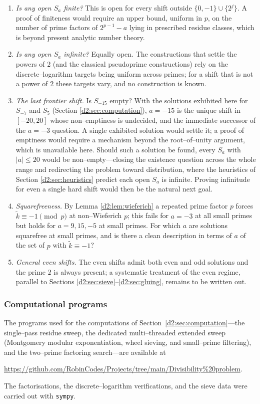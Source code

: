 \documentclass[a4paper]{article}
\theoremstyle{plain}
\theoremstyle{definition}
\theoremstyle{remark}
\newcommand{\Sa}{S_a}
\begin{document}
\begin{enumerate}
\item \emph{Is any open $\Sa$ finite?} This is open for every shift outside $\{0,-1\}\cup\{2^{j}\}$. A proof of finiteness would require an upper bound, uniform in $p$, on the number of prime factors of $2^{p-1}-a$ lying in prescribed residue classes, which is beyond present analytic number theory.
\item \emph{Is any open $\Sa$ infinite?} Equally open. The constructions that settle the powers of $2$ (and the classical pseudoprime constructions) rely on the discrete--logarithm targets being uniform across primes; for a shift that is not a power of $2$ these targets vary, and no construction is known.
\item \emph{The last frontier shift.} Is $S_{-15}$ empty? With the solutions exhibited here for $S_{-7}$ and $S_5$ (Section \ref{d2:sec:computation}), $a=-15$ is the unique shift in $[-20,20]$ whose non--emptiness is undecided, and the immediate successor of the $a=-3$ question. A single exhibited solution would settle it; a proof of emptiness would require a mechanism beyond the root--of--unity argument, which is unavailable here. Should such a solution be found, every $S_a$ with $|a|\le20$ would be non--empty---closing the existence question across the whole range and redirecting the problem toward distribution, where the heuristics of Section \ref{d2:sec:heuristics} predict each open $S_a$ is infinite. Proving infinitude for even a single hard shift would then be the natural next goal.
\item \emph{Squarefreeness.} By Lemma \ref{d2:lem:wieferich} a repeated prime factor $p$ forces $\widetilde k\equiv-1\pmod p$ at non--Wieferich $p$; this fails for $a=-3$ at all small primes but holds for $a=9,15,-5$ at small primes. For which $a$ are solutions squarefree at small primes, and is there a clean description in terms of $a$ of the set of $p$ with $\widetilde k\equiv-1$?
\item \emph{General even shifts.} The even shifts admit both even and odd solutions and the prime $2$ is always present; a systematic treatment of the even regime, parallel to Sections \ref{d2:sec:sieve}--\ref{d2:sec:gluing}, remains to be written out.
\end{enumerate}


\subsubsection{Computational programs}\label{d2:app:programs}
The programs used for the computations of Section~\ref{d2:sec:computation}---the single--pass residue sweep, the dedicated multi--threaded extended sweep (Montgomery modular exponentiation, wheel sieving, and small--prime filtering), and the two--prime factoring search---are available at
\begin{center}
\url{https://github.com/RobinCodes/Projects/tree/main/Divisibility%20problem}.
\end{center}
The factorisations, the discrete--logarithm verifications, and the sieve data were carried out with \texttt{sympy}.
\end{document}
